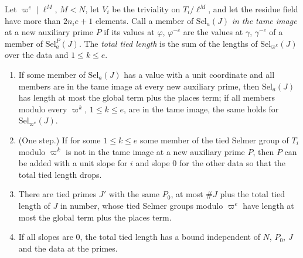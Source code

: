 \begin{lemma}\label{lem:descent-steps}
Let $\varpi^e\mid\ell^M$, $M<N$, let $V_i$ be the triviality on $T_i/\ell^M$, and let the residue field have more than $2n_ie+1$ elements. Call a member of $\mathrm{Sel}_a(J)$ \emph{in the tame image} at a new auxiliary prime $P$ if its values at $\varphi$, $\varphi^{-c}$ are the values at $\gamma$, $\gamma^{-c}$ of a member of
$\mathrm{Sel}^P_a(J)$. The \emph{total tied length} is the sum of the lengths of $\mathrm{Sel}_{\varpi^k}(J)$ over the data and $1\le k\le e$.
\begin{enumerate}[label=\textup{(\alph*)}]
\item If some member of $\mathrm{Sel}_a(J)$ has a value with a unit coordinate and all members are in the tame image at every new auxiliary prime, then $\mathrm{Sel}_a(J)$ has length at most the global term plus the places term; if all members modulo every $\varpi^k$, $1\le k\le e$, are in the tame image, the same holds for
$\mathrm{Sel}_{\varpi^e}(J)$.
\item (One step.) If for some $1\le k\le e$ some member of the tied Selmer group of $T_i$ modulo $\varpi^k$ is not in the tame image at a new auxiliary prime $P$, then $P$ can be added with a unit slope for $i$ and slope $0$ for the other data so that the total tied length drops.
\item There are tied primes $J'$ with the same $P_0$, at most $\#J$ plus the total tied length of $J$ in number, whose tied Selmer groups modulo $\varpi^e$ have length at most the global term plus the places term.
\item If all slopes are $0$, the total tied length has a bound independent of $N$, $P_0$, $J$ and the data at the primes.
\end{enumerate}
\end{lemma}

